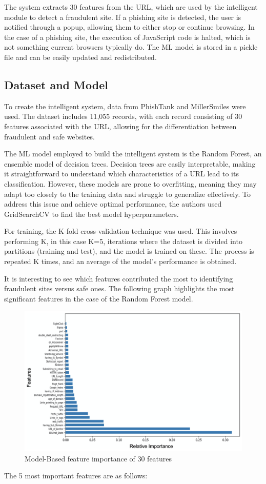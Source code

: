 The system extracts 30 features from the URL, which are used by the intelligent module to detect a fraudulent site. If a phishing site is detected, the user is notified through a popup, allowing them to either stop or continue browsing. In the case of a phishing site, the execution of JavaScript code is halted, which is not something current browsers typically do. The ML model is stored in a pickle file and can be easily updated and redistributed.

\subsection{Dataset and Model}
To create the intelligent system, data from PhishTank and MillerSmiles were used. The dataset includes 11,055 records, with each record consisting of 30 features associated with the URL, allowing for the differentiation between fraudulent and safe websites.

The ML model employed to build the intelligent system is the Random Forest, an ensemble model of decision trees. Decision trees are easily interpretable, making it straightforward to understand which characteristics of a URL lead to its classification. However, these models are prone to overfitting, meaning they may adapt too closely to the training data and struggle to generalize effectively. To address this issue and achieve optimal performance, the authors used GridSearchCV to find the best model hyperparameters.

For training, the K-fold cross-validation technique was used. This involves performing K, in this case K=5, iterations where the dataset is divided into partitions (training and test), and the model is trained on these. The process is repeated K times, and an average of the model's performance is obtained.

It is interesting to see which features contributed the most to identifying fraudulent sites versus safe ones. The following graph highlights the most significant features in the case of the Random Forest model.

\begin{figure}[htp]
    \centering
    \includegraphics[width=1\linewidth]{images/30features_importance.png}
    \caption{Model-Based feature importance of 30 features}
    \label{fig:Relative importance of features}
\end{figure}
The 5 most important features are as follows:

